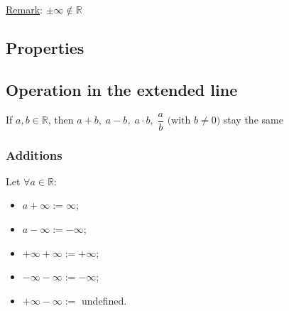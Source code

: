 \documentclass{article}
\newcommand{\figbox}[1]{ 
    \begin{figure*}[ht!]        
        \begin{center}            
            \fbox{#1}        
        \end{center}    
    \end{figure*}
}
\newcommand{\rem}{\underline{Remark}: }
\newcommand{\sht}{\ |\ }
\begin{document}
\rem{$\pm \infty \notin \mathbb{R}$}

\subsection{Properties}
\figbox{$\forall x \in \mathbb{R} \ \sht \ \infty > x \ \sht \ -\infty < 0$}

\subsection{Operation in the extended line}
If $a,b \in \mathbb{R}$, then $a+b,\; a-b,\; a\cdot b,\; \dfrac{a}{b} \text{ (with } b\neq 0 )$ stay the same

\subsubsection{Additions}
Let $\forall a \in \mathbb{R}$:
\begin{itemize}
    \item $a+\infty := \infty$;
    \item $a-\infty := -\infty$;
    \item $+\infty + \infty := +\infty$;
    \item $-\infty - \infty := -\infty$;
    \item $+\infty - \infty :=$ undefined.
\end{itemize}
\end{document}

